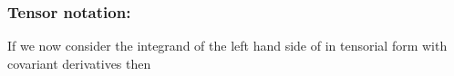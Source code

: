 \subsubsection{Tensor notation:}
If we now consider the integrand of the left hand side of
 in tensorial form with covariant
derivatives then
% 
% 
% 
